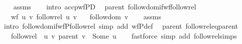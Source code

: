 \begin{isabellebody}
%
\isadelimproof
\ \ %
\endisadelimproof
%
\isatagproof
{}\isamarkupfalse%
\ assms\isanewline
\ \ \isamarkupfalse%
\ {\isacharparenleft}{\kern0pt}intro\ accp{\isacharunderscore}{\kern0pt}wfPD{\isacharparenright}{\kern0pt}%
\endisatagproof
{\isafoldproof}%
%
\isadelimproof
\isanewline
%
\endisadelimproof
\isanewline
{}\isamarkupfalse%
\ {\isacharparenleft}{\kern0pt}\ parent{\isacharparenright}{\kern0pt}\ follow{\isacharunderscore}{\kern0pt}dom{\isacharunderscore}{\kern0pt}if{\isacharunderscore}{\kern0pt}wf{\isacharunderscore}{\kern0pt}follow{\isacharunderscore}{\kern0pt}rel{\isacharcolon}{\kern0pt}\isanewline
\ \ \ {\isachardoublequoteopen}wf\ {\isacharbraceleft}{\kern0pt}{\isacharparenleft}{\kern0pt}u{\isacharcomma}{\kern0pt}\ v{\isacharparenright}{\kern0pt}{\isachardot}{\kern0pt}\ follow{\isacharunderscore}{\kern0pt}rel\ u\ v{\isacharbraceright}{\kern0pt}{\isachardoublequoteclose}\isanewline
\ \ \ {\isachardoublequoteopen}follow{\isacharunderscore}{\kern0pt}dom\ v{\isachardoublequoteclose}\isanewline
%
\isadelimproof
\ \ %
\endisadelimproof
%
\isatagproof
{}\isamarkupfalse%
\ assms\isanewline
\ \ \isamarkupfalse%
\ {\isacharparenleft}{\kern0pt}intro\ follow{\isacharunderscore}{\kern0pt}dom{\isacharunderscore}{\kern0pt}if{\isacharunderscore}{\kern0pt}wfP{\isacharunderscore}{\kern0pt}follow{\isacharunderscore}{\kern0pt}rel{\isacharparenright}{\kern0pt}\ {\isacharparenleft}{\kern0pt}simp\ add{\isacharcolon}{\kern0pt}\ wfP{\isacharunderscore}{\kern0pt}def{\isacharparenright}{\kern0pt}%
\endisatagproof
{\isafoldproof}%
%
\isadelimproof
\isanewline
%
\endisadelimproof
\isanewline
{}\isamarkupfalse%
\ {\isacharparenleft}{\kern0pt}\ parent{\isacharparenright}{\kern0pt}\ follow{\isacharunderscore}{\kern0pt}rel{\isacharunderscore}{\kern0pt}eq{\isacharunderscore}{\kern0pt}parent{\isacharcolon}{\kern0pt}\isanewline
\ \ \ {\isachardoublequoteopen}follow{\isacharunderscore}{\kern0pt}rel\ {\isacharequal}{\kern0pt}\ {\isacharparenleft}{\kern0pt}{\isasymlambda}u\ v{\isachardot}{\kern0pt}\ parent\ v\ {\isacharequal}{\kern0pt}\ Some\ u{\isacharparenright}{\kern0pt}{\isachardoublequoteclose}\isanewline
%
\isadelimproof
\ \ %
\endisadelimproof
%
\isatagproof
{}\isamarkupfalse%
\ {\isacharparenleft}{\kern0pt}fastforce\ simp\ add{\isacharcolon}{\kern0pt}\ follow{\isacharunderscore}{\kern0pt}rel{\isachardot}{\kern0pt}simps{\isacharparenright}{\kern0pt}%
\endisatagproof
{\isafoldproof}%
%

\end{isabellebody}
